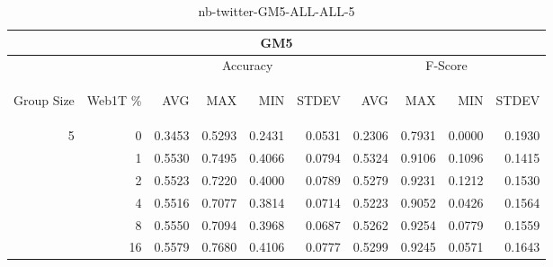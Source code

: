 \begin{center}
\begin{table}[htbp]
\begin{center}
\begin{tabular}{ | r | r | r | r | r | r | r | r | r | r |}
\hline
\multicolumn{10}{|c|}{GM5}\\
\hline
 & & \multicolumn{4}{|c|}{Accuracy} & \multicolumn{4}{|c|}{F-Score}\\ \cline{3-10}
\begin{sideways}Group Size\end{sideways} & \begin{sideways}Web1T \%\end{sideways} & \begin{sideways}AVG\end{sideways} & \begin{sideways}MAX\end{sideways} & \begin{sideways}MIN\end{sideways} & \begin{sideways}STDEV\end{sideways} & \begin{sideways}AVG\end{sideways} & \begin{sideways}MAX\end{sideways} & \begin{sideways}MIN\end{sideways} & \begin{sideways}STDEV\end{sideways}\\
\hline
\multirow{5}{*}{5}
 & 0 & 0.3453 & 0.5293 & 0.2431 & 0.0531 & 0.2306 & 0.7931 & 0.0000 & 0.1930\\ \cline{2-10}
 & 1 & 0.5530 & 0.7495 & 0.4066 & 0.0794 & 0.5324 & 0.9106 & 0.1096 & 0.1415\\ \cline{2-10}
 & 2 & 0.5523 & 0.7220 & 0.4000 & 0.0789 & 0.5279 & 0.9231 & 0.1212 & 0.1530\\ \cline{2-10}
 & 4 & 0.5516 & 0.7077 & 0.3814 & 0.0714 & 0.5223 & 0.9052 & 0.0426 & 0.1564\\ \cline{2-10}
 & 8 & 0.5550 & 0.7094 & 0.3968 & 0.0687 & 0.5262 & 0.9254 & 0.0779 & 0.1559\\ \cline{2-10}
 & 16 & 0.5579 & 0.7680 & 0.4106 & 0.0777 & 0.5299 & 0.9245 & 0.0571 & 0.1643\\ \cline{2-10}
\hline
\end{tabular}
\caption{nb-twitter-GM5-ALL-ALL-5}
\label{table:nb-twitter-GM5-ALL-ALL-5}
\end{center}
\end{table}
\end{center}

